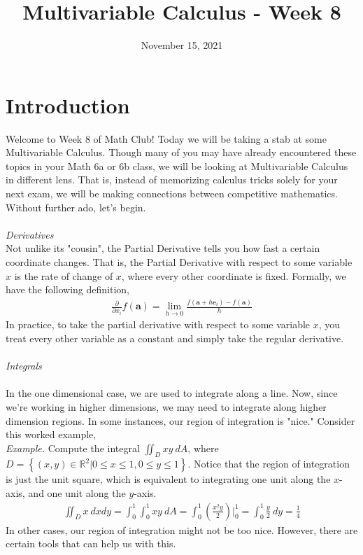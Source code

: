 \documentclass{article}
\title{Multivariable Calculus - Week 8}
\author{}
\date{November 15, 2021}
\begin{document}
\section{Introduction}

Welcome to Week 8 of Math Club! Today we will be taking a stab at some Multivariable Calculus. Though many 
of you may have already encountered these topics in your Math 6a or 6b class, we will be looking at Multivariable Calculus in different lens. That is, instead of memorizing calculus tricks solely for your next exam, we will be making connections between competitive mathematics. Without further ado, let's begin.
\\\\
\emph{Derivatives} \\
Not unlike its "cousin", the Partial Derivative tells you how fast a certain coordinate changes. 
That is, the Partial Derivative with respect to some variable $x$ is the rate of change of $x$, where every other coordinate is fixed. Formally, we have the following definition,
\begin{align*} 
    \frac{\partial}{\partial x_i} f(\textbf{a}) = \lim_{h \rightarrow 0 } \frac{f(\textbf{a} + h\textbf{e}_i) - f(\textbf{a})}{h} 
\end{align*}
In practice, to take the partial derivative with respect to some variable $x$, you treat every other variable as a constant and simply take the regular derivative. 
\\\\
\emph{Integrals} \\\\
In the one dimensional case, we are used to integrate along a line. Now, since we're working in higher dimensions, we may need to integrate along higher dimension regions. In some instances, our region of integration is "nice."  Consider this worked example,\\
\emph{Example.} Compute the integral $\iint_D xy\ d\!A$, where $D = \left\{ (x,y) \in \mathbb{R}^2 | 0 \leq x \leq 1, 0 \leq y \leq 1 \right\}$. Notice that the region of integration is just the unit square, which is equivalent to integrating one unit along the $x$-axis, and one unit along the $y$-axis.
\begin{align*} 
    \iint_D x\ d\!xd\!y = \int_{0}^1\int_{0}^1 xy\ d\!A = \int_{0}^{1} \left(\frac{x^2y}{2}\right)\bigg|_{0}^{1} = \int_{0}^1 \frac{y}{2}\ d\!y = \frac{1}{4}
\end{align*}
In other cases, our region of integration might not be too nice.
However, there are certain tools that can help us with this. \\\\
\end{document}
